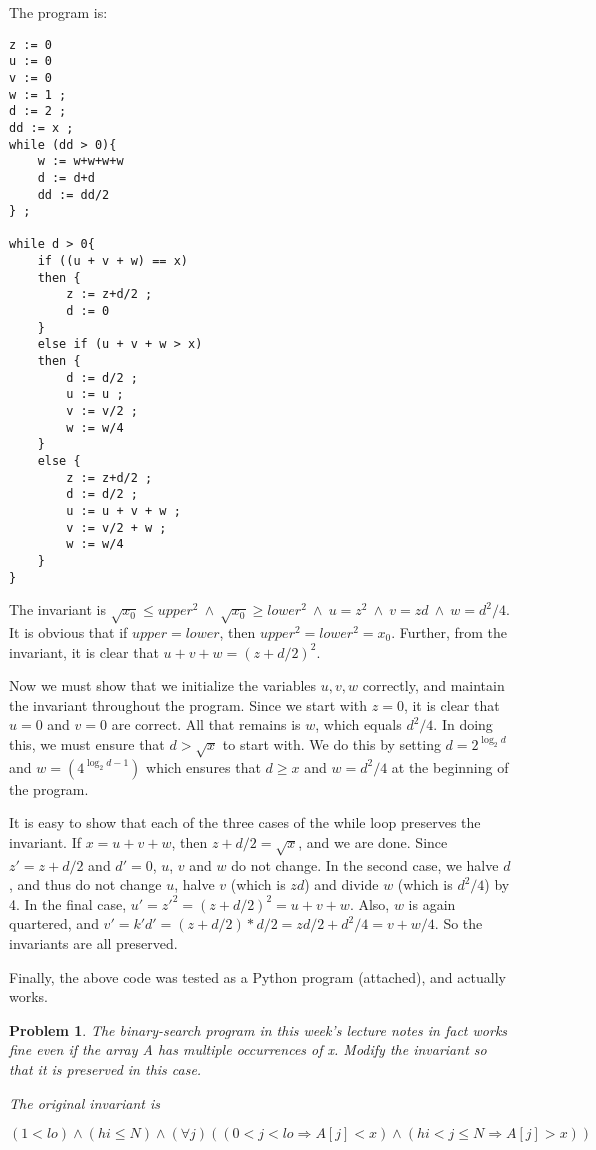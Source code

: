 \documentclass[12pt]
{article}
\newtheorem{problem}[theorem]{Problem}
\newenvironment{solution}[1][Solution]{\begin{trivlist}
\item[\hskip \labelsep {\bfseries #1}]}{\end{trivlist}}
\begin{document}
\begin{solution}
  The program is:
  \begin{verbatim}
z := 0
u := 0
v := 0
w := 1 ;
d := 2 ;
dd := x ;
while (dd > 0){
    w := w+w+w+w
    d := d+d
    dd := dd/2
} ;

while d > 0{
    if ((u + v + w) == x)
    then {
        z := z+d/2 ;
        d := 0
    }
    else if (u + v + w > x) 
    then {
        d := d/2 ;
        u := u ;
        v := v/2 ;
        w := w/4
    }
    else {
        z := z+d/2 ;
        d := d/2 ;
        u := u + v + w ;
        v := v/2 + w ;
        w := w/4
    }
}
  \end{verbatim}

The invariant is $\sqrt{x_0} \leq upper^2 ~\wedge~ \sqrt{x_0} \geq
lower^2 ~\land~ u = z^2 ~\land~ v = zd ~\land~ w = {d^2}/{4}$.  It is
obvious that if $upper = lower$, then $upper^2 = lower^2 = x_0$.
Further, from the invariant, it is clear that $u + v + w =
(z+d/2)^2$.  

Now we must show that we initialize the variables $u,v,w$ correctly,
and maintain the invariant throughout the program. Since we start with
$z = 0$, it is clear that $u = 0$  and $v = 0$ are correct.  All that
remains is $w$, which equals $d^2/4$.  In doing this, we must ensure
that $d > \sqrt{x}$ to start with.  We do this by setting $d =
2^{\log_2 d}$ and $w=(4^{\log_2 d - 1})$ which ensures that $d \geq x$
and $w = d^2/4$ at the beginning of the program.

It is easy to show that each of the three cases of the while loop
preserves the invariant.  If $x = u+v+w$, then $z+d/2 = \sqrt{x}$, and
we are done.  Since $z' = z+d/2$ and $d' = 0$, $u$, $v$ and $w$ do not
change.    In the second case, we halve $d$, and thus do not change
$u$, halve $v$ (which is $zd$) and divide $w$ (which is $d^2/4$) by
4.  In the final case, $u' = z'^2 = (z+d/2)^2 = u + v + w$.  Also, $w$
is again quartered, and $v' = k'd' = (z+d/2)*d/2 = zd/2 + d^2/4 = v +
w/4$.  So the invariants are all preserved.

Finally, the above code was tested as a Python program (attached), and
actually works.
\end{solution}

\begin{problem}
The binary-search program in this week's lecture notes in fact works
fine even if the array A has multiple occurrences of x. Modify the
invariant so that it is preserved in this case.

The original invariant is

\[
(1 < lo) \land (hi \leq N) \land 
(\forall j)((0 < j < lo \Rightarrow A[j] < x)
\land (hi < j \leq N \Rightarrow  A[j] > x))
\]

\end {problem}
\end{document}
